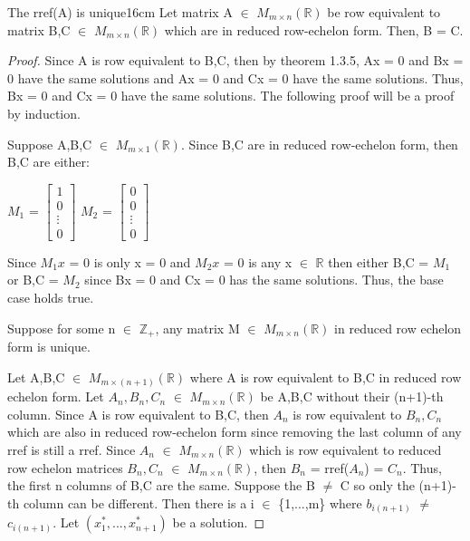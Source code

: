     \newpage


    
    \begin{wtheorem}{The rref(A) is unique}{16cm}
        Let matrix A $\in$ $M_{m \times n}(\mathbb{R})$
        be row equivalent to matrix B,C $\in$ $M_{m \times n}(\mathbb{R})$
        which are in reduced row-echelon form. Then, B = C.
    \end{wtheorem}

    \begin{proof}
        Since A is row equivalent to B,C, then by {\color{red} theorem 1.3.5},
        Ax = 0 and Bx = 0 have the same solutions and
        Ax = 0 and Cx = 0 have the same solutions. Thus,
        Bx = 0 and Cx = 0 have the same solutions.
        The following proof will be a proof by induction.

        Suppose A,B,C $\in$ $M_{m \times 1}(\mathbb{R})$.
        Since B,C are in reduced row-echelon form, then B,C are either:

        \hspace{0.5cm}
        \footnotesize
        $M_1$ =
        $\begin{bmatrix}
            1 \\
            0 \\
            \vdots \\
            0
        \end{bmatrix}$
        \hspace{0.5cm}
        $M_2$ =
        $\begin{bmatrix}
            0 \\
            0 \\
            \vdots \\
            0
        \end{bmatrix}$

        \normalsize
        Since $M_1x$ = 0 is only x = 0 and
        $M_2x$ = 0 is any x $\in$ $\mathbb{R}$
        then either B,C = $M_1$ or B,C = $M_2$
        since Bx = 0 and Cx = 0 has the same solutions.
        Thus, the base case holds true.

        Suppose for some n $\in$ $\mathbb{Z_+}$,
        any matrix M $\in$ $M_{m \times n}(\mathbb{R})$
        in reduced row echelon form is unique.

        Let A,B,C $\in$ $M_{m \times (n+1)}(\mathbb{R})$
        where A is row equivalent to B,C in reduced row echelon form.
        Let $A_n,B_n,C_n$ $\in$ $M_{m \times n}(\mathbb{R})$
        be A,B,C without their (n+1)-th column.
        Since A is row equivalent to B,C, then $A_n$ is row equivalent
        to $B_n,C_n$ which are also in reduced row-echelon form since
        removing the last column of any rref is still a rref.
        Since $A_n$ $\in$ $M_{m \times n}(\mathbb{R})$
        which is row equivalent to
        reduced row echelon matrices $B_n,C_n$ $\in$ $M_{m \times n}(\mathbb{R})$,
        then $B_n$ = rref($A_n$) = $C_n$.
        Thus, the first n columns of B,C are the same.
        Suppose the B $\not =$ C so only the (n+1)-th column can be different.
        Then there is a i $\in$ \{1,...,m\} where
        $b_{i(n+1)}$ $\not =$ $c_{i(n+1)}$.
        Let $(x_1^*,...,x_{n+1}^*)$ be a solution.


\end{proof}
